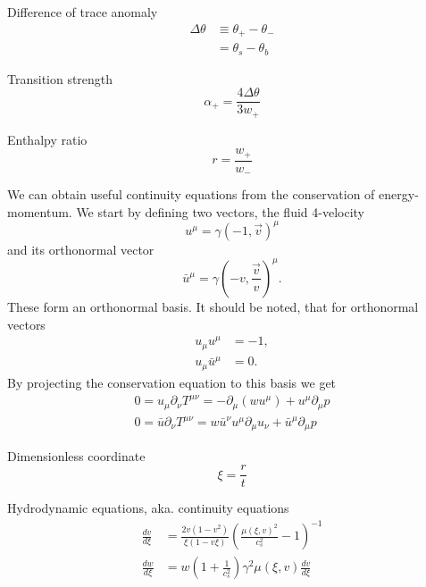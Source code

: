 Difference of trace anomaly
\begin{align}
\Delta \theta
&\equiv \theta_+ - \theta_- \\
&= \theta_s - \theta_b
\end{align}

Transition strength
\begin{equation}
\alpha_+ = \frac{4 \Delta \theta}{3 w_+}
\end{equation}

Enthalpy ratio
\begin{equation}
r = \frac{w_+}{w_-}
\end{equation}

We can obtain useful continuity equations from the conservation of energy-momentum.
We start by defining two vectors, the fluid 4-velocity
\begin{equation}
u^\mu = \gamma(-1, \overrightarrow{v})^\mu
\end{equation}
and its orthonormal vector
\begin{equation}
\bar{u}^\mu = \gamma(-v, \frac{\overrightarrow{v}}{v})^\mu.
\end{equation}
These form an orthonormal basis.
It should be noted, that for orthonormal vectors
\begin{align}
u_\mu u^\mu &= -1, \\
u_\mu \bar{u}^\mu &= 0.
\end{align}
By projecting the conservation equation to this basis we get
\begin{align}
0 = u_\mu \partial_\nu T^{\mu \nu} = -\partial_\mu (w u^\mu) + u^\mu \partial_\mu p \\
0 = \bar{u} \partial_\nu T^{\mu \nu} = w \bar{u}^\nu u^\mu \partial_\mu u_\nu + \bar{u}^\mu \partial_\mu p
\end{align}

Dimensionless coordinate
\begin{equation}
\xi = \frac{r}{t}
\end{equation}

Hydrodynamic equations, aka. continuity equations
\cites[eq. 7.30-7.31]{lecture_notes}[eq. 5]{giese_2021}
\begin{align}
\frac{dv}{d\xi} &= \frac{2v(1-v^2)}{\xi(1-v\xi)} \left( \frac{\mu(\xi,v)^2}{c_s^2} - 1 \right)^{-1} \\
\frac{dw}{d\xi} &= w \left( 1 + \frac{1}{c_s^2} \right) \gamma^2 \mu(\xi,v) \frac{dv}{d\xi}
\end{align}


